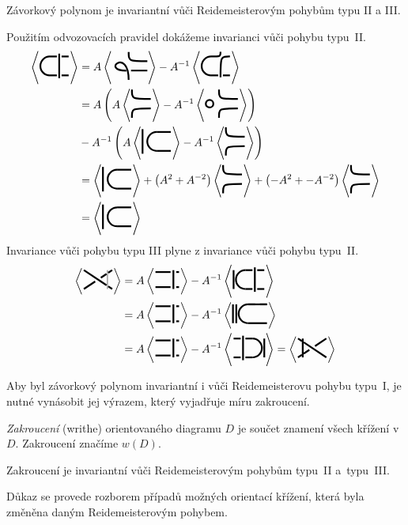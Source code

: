 \begin{tvrz}\label{t01:3}
Závorkový polynom je invariantní vůči Reidemeisterovým pohybům typu II a III.
\end{tvrz}
\begin{dukaz}
Použitím odvozovacích pravidel dokážeme invarianci vůči pohybu typu~II.
\begin{equation*}
\begin{split}
\left< \reiddva \right> & = A \left< \FO \right> - A^{-1} \left< \BO \right> \\ & = A \left( A \left< \DO \right> - A^{-1} \left< \EO \right> \right) \\ & - A^{-1} \left( A \left< \CO \right> - A^{-1} \left< \DO \right> \right) \\ & = \left< \CO \right> + \left( A^2 + A^{-2} \right) \left< \DO \right> + \left( -A^2 + -A^{-2} \right) \left< \DO \right>  \\ & = \left< \CO \right>
\end{split}
\end{equation*}
Invariance vůči pohybu typu III plyne z invariance vůči pohybu typu~II.
\begin{equation*}
\begin{split}
\left< \GO \right> & = A \left< \JO \right> - A^{-1} \left< \IO \right> \\ & = A \left< \JO \right> - A^{-1} \left< \KO \right>  \\ & = A \left< \JO \right> - A^{-1} \left< \LO \right> = \left< \HO \right>
\end{split}
\end{equation*}
\end{dukaz}

Aby byl závorkový polynom invariantní i vůči Reidemeisterovu pohybu typu~I, je nutné vynásobit jej výrazem, který vyjadřuje míru zakroucení.

\begin{definice}\label{def01:3}
\emph{Zakroucení} (writhe) orientovaného diagramu $D$ je součet znamení všech křížení v $D$. Zakroucení značíme $w(D)$.
\end{definice}

\begin{lemma}\label{l01:4}
Zakroucení je invariantní vůči Reidemeisterovým pohybům typu~II a~typu~III.
\end{lemma}
\begin{dukaz}
Důkaz se provede rozborem případů možných orientací křížení, která byla změněna daným Reidemeisterovým pohybem.
\end{dukaz}

